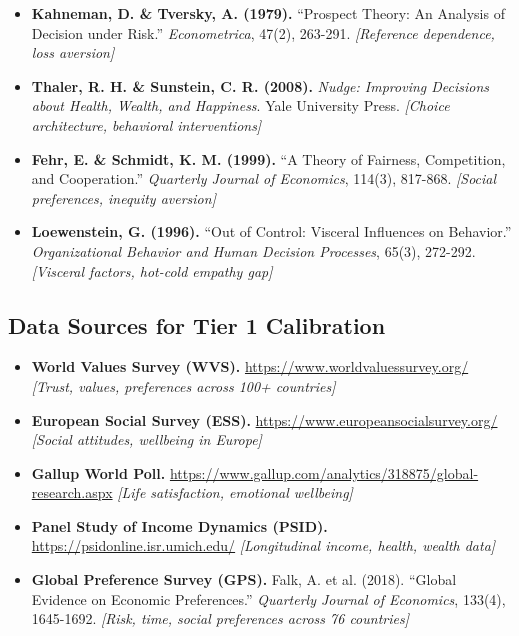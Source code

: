 \documentclass[11pt,a4paper]{article}
\theoremstyle{definition}
\begin{document}
\begin{itemize}

\item \textbf{Kahneman, D. \& Tversky, A. (1979).} 
``Prospect Theory: An Analysis of Decision under Risk.'' 
\textit{Econometrica}, 47(2), 263-291.
\textit{[Reference dependence, loss aversion]}

\item \textbf{Thaler, R. H. \& Sunstein, C. R. (2008).} 
\textit{Nudge: Improving Decisions about Health, Wealth, and Happiness}. 
Yale University Press.
\textit{[Choice architecture, behavioral interventions]}

\item \textbf{Fehr, E. \& Schmidt, K. M. (1999).} 
``A Theory of Fairness, Competition, and Cooperation.'' 
\textit{Quarterly Journal of Economics}, 114(3), 817-868.
\textit{[Social preferences, inequity aversion]}

\item \textbf{Loewenstein, G. (1996).} 
``Out of Control: Visceral Influences on Behavior.'' 
\textit{Organizational Behavior and Human Decision Processes}, 65(3), 272-292.
\textit{[Visceral factors, hot-cold empathy gap]}

\end{itemize}

\subsection{Data Sources for Tier 1 Calibration}

\begin{itemize}

\item \textbf{World Values Survey (WVS).} 
\url{https://www.worldvaluessurvey.org/}
\textit{[Trust, values, preferences across 100+ countries]}

\item \textbf{European Social Survey (ESS).} 
\url{https://www.europeansocialsurvey.org/}
\textit{[Social attitudes, wellbeing in Europe]}

\item \textbf{Gallup World Poll.} 
\url{https://www.gallup.com/analytics/318875/global-research.aspx}
\textit{[Life satisfaction, emotional wellbeing]}

\item \textbf{Panel Study of Income Dynamics (PSID).} 
\url{https://psidonline.isr.umich.edu/}
\textit{[Longitudinal income, health, wealth data]}

\item \textbf{Global Preference Survey (GPS).} 
Falk, A. et al. (2018). ``Global Evidence on Economic Preferences.'' 
\textit{Quarterly Journal of Economics}, 133(4), 1645-1692.
\textit{[Risk, time, social preferences across 76 countries]}

\end{itemize}
\end{document}
